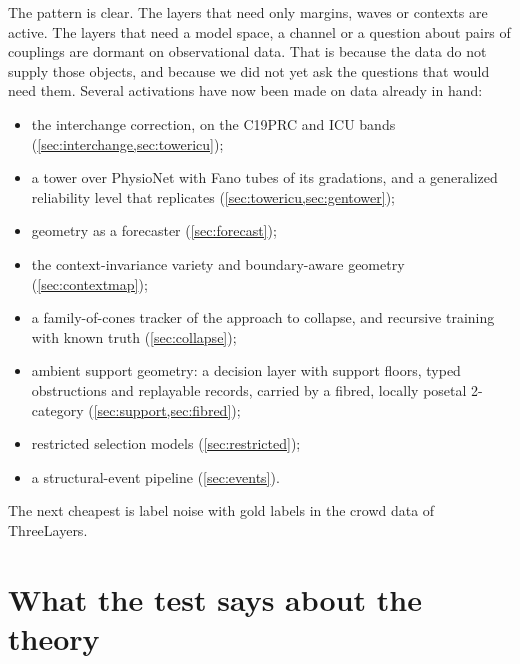 \documentclass[11pt]{article}
\theoremstyle{definition}
\theoremstyle{remark}
\begin{document}
The pattern is clear. The layers that need only margins, waves or contexts are active. The layers that need a model space, a channel or
a question about pairs of couplings are dormant on observational data. That is because the data do not supply those objects, and
because we did not yet ask the questions that would need them. Several activations have now been made on data already in hand:
\begin{itemize}[leftmargin=*,nosep]
\item the interchange correction, on the C19PRC and ICU bands (\cref{sec:interchange,sec:towericu});
\item a tower over PhysioNet with Fano tubes of its gradations, and a generalized reliability level that replicates (\cref{sec:towericu,sec:gentower});
\item geometry as a forecaster (\cref{sec:forecast});
\item the context-invariance variety and boundary-aware geometry (\cref{sec:contextmap});
\item a family-of-cones tracker of the approach to collapse, and recursive training with known truth (\cref{sec:collapse});
\item ambient support geometry: a decision layer with support floors, typed obstructions and replayable records, carried by a fibred, locally posetal 2-category (\cref{sec:support,sec:fibred});
\item restricted selection models (\cref{sec:restricted});
\item a structural-event pipeline (\cref{sec:events}).
\end{itemize}
The next cheapest is label noise with gold labels in the crowd data of ThreeLayers.

\section{What the test says about the theory}\label{sec:theory}
\end{document}
